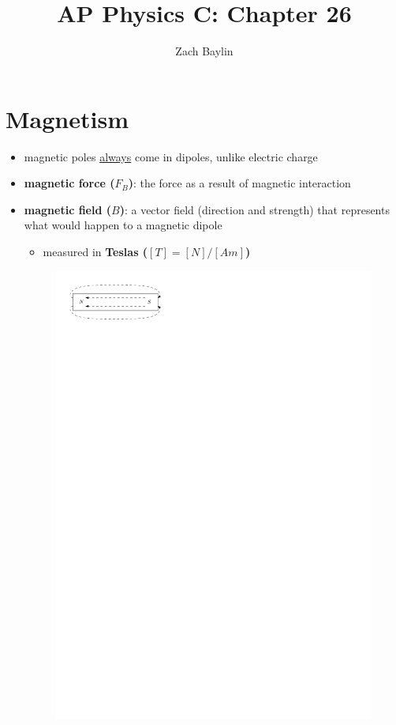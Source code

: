 \documentclass{article}
\title{AP Physics C: Chapter 26}
\author{Zach Baylin}
\begin{document}
  \maketitle
  \section{Magnetism}
    \begin{itemize}
      \item magnetic poles \underline{always} come in dipoles, unlike electric charge
      \item \textbf{magnetic force ($F_B$)}: the force as a result of magnetic interaction
      \item \textbf{magnetic field ($B$)}: a vector field (direction and strength) that represents what would happen to a magnetic dipole
        \begin{itemize}
          \item measured in \textbf{Teslas ($[T]=[N]/[Am]$)}
        \end{itemize}
      \begin{figure}[H]
        \centering
        \includegraphics{figures/magnet-direction.pdf}

\end{figure}
\end{itemize}
\end{document}
